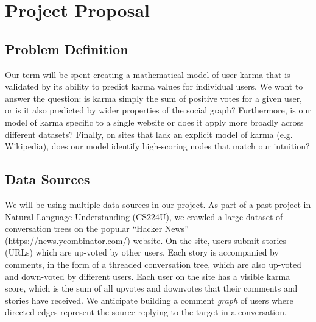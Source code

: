 \documentclass[10pt]{article}
\begin{document}


\section{Project Proposal} \subsection{Problem Definition}
Our term will be spent creating a mathematical model of user karma that is
validated by its ability to predict karma values for individual users. We want
to answer the question: is karma simply the sum of positive votes for a given
user, or is it also predicted by wider properties of the social graph?
Furthermore, is our model of karma specific to a single website or does it apply
more broadly across different datasets?  Finally, on sites that lack an explicit
model of karma (e.g. Wikipedia), does our model identify high-scoring nodes that
match our intuition?

\subsection{Data Sources}
We will be using multiple data sources in our project. As part of a past project
in Natural Language Understanding (CS224U), we crawled a large dataset of
conversation trees on the popular ``Hacker News''
(\url{https://news.ycombinator.com/}) website. On the site, users submit stories
(URLs) which are up-voted by other users. Each story is accompanied by comments,
in the form of a threaded conversation tree, which are also up-voted and
down-voted by different users. Each user on the site has a visible karma score,
which is the sum of all upvotes and downvotes that their comments and stories
have received.  We anticipate building a comment \textit{graph} of users where
directed edges represent the source replying to the target in a conversation.
\end{document}
